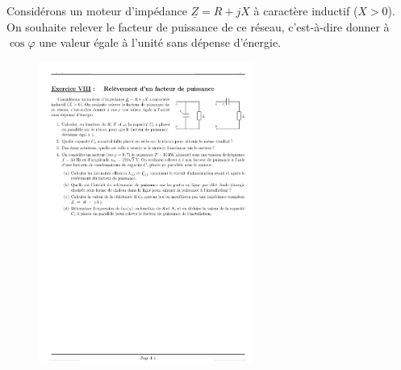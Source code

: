 
Considérons un moteur d’impédance $\underline{Z} = R + jX$ à caractère inductif ($X > 0$). On souhaite relever le facteur de puissance de ce réseau, c’est-à-dire donner à $\cos\varphi$ une valeur égale à l’unité sans dépense d’énergie.

\begin{figure}[h]
 \centering
\includegraphics[width=7cm]{fig-exemple-1}
 \end{figure}

